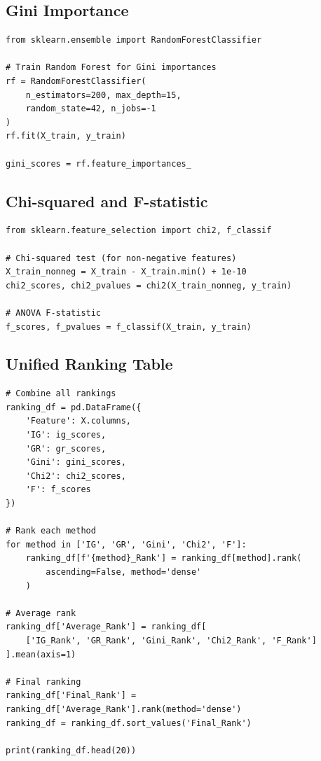 \subsection{Gini Importance}

\begin{verbatim}
from sklearn.ensemble import RandomForestClassifier

# Train Random Forest for Gini importances
rf = RandomForestClassifier(
    n_estimators=200, max_depth=15, 
    random_state=42, n_jobs=-1
)
rf.fit(X_train, y_train)

gini_scores = rf.feature_importances_
\end{verbatim}

\subsection{Chi-squared and F-statistic}

\begin{verbatim}
from sklearn.feature_selection import chi2, f_classif

# Chi-squared test (for non-negative features)
X_train_nonneg = X_train - X_train.min() + 1e-10
chi2_scores, chi2_pvalues = chi2(X_train_nonneg, y_train)

# ANOVA F-statistic
f_scores, f_pvalues = f_classif(X_train, y_train)
\end{verbatim}

\subsection{Unified Ranking Table}

\begin{verbatim}
# Combine all rankings
ranking_df = pd.DataFrame({
    'Feature': X.columns,
    'IG': ig_scores,
    'GR': gr_scores,
    'Gini': gini_scores,
    'Chi2': chi2_scores,
    'F': f_scores
})

# Rank each method
for method in ['IG', 'GR', 'Gini', 'Chi2', 'F']:
    ranking_df[f'{method}_Rank'] = ranking_df[method].rank(
        ascending=False, method='dense'
    )

# Average rank
ranking_df['Average_Rank'] = ranking_df[
    ['IG_Rank', 'GR_Rank', 'Gini_Rank', 'Chi2_Rank', 'F_Rank']
].mean(axis=1)

# Final ranking
ranking_df['Final_Rank'] = ranking_df['Average_Rank'].rank(method='dense')
ranking_df = ranking_df.sort_values('Final_Rank')

print(ranking_df.head(20))
\end{verbatim}

